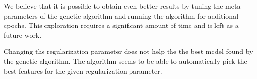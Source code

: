 We believe that it is possible to obtain even better results by tuning the meta-parameters of the genetic algorithm and running the algorithm for additional epochs.
This exploration requires a significant amount of time and is left as a future work.

Changing the regularization parameter does not help the the best model found by the genetic algorithm.
The algorithm seems to be able to automatically pick the best features for the given regularization parameter.
